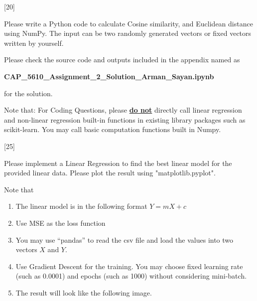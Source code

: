 \documentclass[12pt,letterpaper, onecolumn]{exam}
\begin{document}
\begin{questions}
    \pagebreak

    [20]

    Please write a Python code to calculate Cosine similarity, and Euclidean distance using NumPy. 
    The input can be two randomly generated vectors or fixed vectors written by yourself.

    \begin{solution}

        Please check the source code and outputs included in the appendix named as

        \begin{center}
            \textbf{CAP\_5610\_Assignment\_2\_Solution\_Arman\_Sayan.ipynb}
        \end{center}
        
        for the solution.
    \end{solution}

    \pagebreak

    Note that: For Coding Questions, please \textbf{\underline{do not}} directly call linear regression and non-linear 
    regression built-in functions in existing library packages such as scikit-learn. You may call basic 
    computation functions built in Numpy.

    [25]

    Please implement a Linear Regression to find the best linear model for the provided
    linear data. Please plot the result using "matplotlib.pyplot".

    Note that

    \begin{enumerate}[label=(\arabic*)]
        \item The linear model is in the following format $Y=mX+c$
        \item Use MSE as the loss function
        \item You may use “pandas” to read the csv file and load the values into two vectors $X$ and $Y$.
        \item Use Gradient Descent for the training. You may choose fixed learning rate (such as
        0.0001) and epochs (such as 1000) without considering mini-batch.
        \item The result will look like the following image.
    \end{enumerate}


\end{questions}
\end{document}
